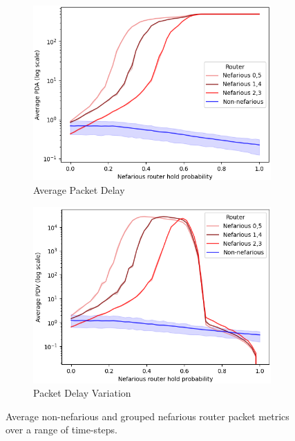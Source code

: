 \begin{figure}[t]
    \centering
    \begin{subfigure}{0.475\textwidth}
        \centering
        \includegraphics[width=\textwidth]{figs/results/grouped_summary_avg.png}
        \caption[]{Average Packet Delay}
        \label{fig:MrouterPDA}
    \end{subfigure}
    \begin{subfigure}{0.475\textwidth}
        \centering
        \includegraphics[width=\textwidth]{figs/results/grouped_summary_pdv.png}
        \caption[]{Packet Delay Variation}
        \label{fig:MrouterPDV}
    \end{subfigure}
    \caption{Average non-nefarious and grouped nefarious router packet metrics over a range of time-steps.}
    \label{fig:Rvarnefrouter}
\end{figure}
